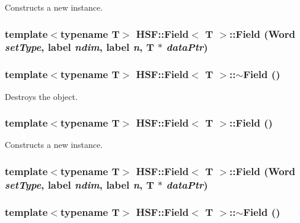 Constructs a new instance. \hypertarget{classHSF_1_1Field_af76ece196c8cc0120f8d2eaa2eb2da16}{
\subsubsection[{Field}]{\setlength{\rightskip}{0pt plus 5cm}template$<$typename T$>$ {\bf HSF::Field}$<$ T $>$::{\bf Field} (Word {\em setType}, \/  label {\em ndim}, \/  label {\em n}, \/  T $\ast$ {\em dataPtr})}}
\label{classHSF_1_1Field_af76ece196c8cc0120f8d2eaa2eb2da16}
\hypertarget{classHSF_1_1Field_a7a1de4fe37f4483401a62dd7b410c577}{
\subsubsection[{$\sim$Field}]{\setlength{\rightskip}{0pt plus 5cm}template$<$typename T$>$ {\bf HSF::Field}$<$ T $>$::$\sim${\bf Field} ()}}
\label{classHSF_1_1Field_a7a1de4fe37f4483401a62dd7b410c577}


Destroys the object. \hypertarget{classHSF_1_1Field_a67ca23ee998b8ec6ff61de5f714db4d6}{
\subsubsection[{Field}]{\setlength{\rightskip}{0pt plus 5cm}template$<$typename T$>$ {\bf HSF::Field}$<$ T $>$::{\bf Field} ()}}
\label{classHSF_1_1Field_a67ca23ee998b8ec6ff61de5f714db4d6}


Constructs a new instance. \hypertarget{classHSF_1_1Field_af76ece196c8cc0120f8d2eaa2eb2da16}{
\subsubsection[{Field}]{\setlength{\rightskip}{0pt plus 5cm}template$<$typename T$>$ {\bf HSF::Field}$<$ T $>$::{\bf Field} (Word {\em setType}, \/  label {\em ndim}, \/  label {\em n}, \/  T $\ast$ {\em dataPtr})}}
\label{classHSF_1_1Field_af76ece196c8cc0120f8d2eaa2eb2da16}
\hypertarget{classHSF_1_1Field_a7a1de4fe37f4483401a62dd7b410c577}{
\subsubsection[{$\sim$Field}]{\setlength{\rightskip}{0pt plus 5cm}template$<$typename T$>$ {\bf HSF::Field}$<$ T $>$::$\sim${\bf Field} ()}}
\label{classHSF_1_1Field_a7a1de4fe37f4483401a62dd7b410c577}


